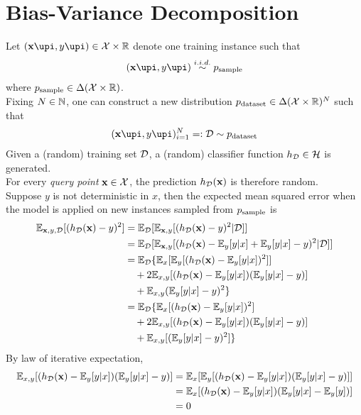 \documentclass{article}
\begin{document}
	\section{Bias-Variance Decomposition}
	\par Let $(\vex\upi, y\upi) \in \mc{X} \times \R$ denote one training instance such that
	\begin{align}
		(\vex\upi, y\upi) \overset{i.i.d.}{\sim} p_{\tx{sample}}
	\end{align}
	where $p_{\text{{sample}}} \in \Delta (\mathcal{{X}} \times \mathbb{R})$. \\
	Fixing $N \in \mathbb{N}$, one can construct a new distribution $p_{\text{{dataset}}} \in \Delta (\mathcal{{X}} \times \mathbb{R})^N$ such that 
	\begin{align}
		(\vex\upi, y\upi)_{i=1}^N =: \mc{D} \sim p_{\tx{dataset}}
	\end{align}
	Given a (random) training set $\mathcal{{D}}$, a (random) classifier function $h_{\mathcal{{D}}} \in \mathcal{{H}}$ is generated. \\
	For every \emph{query point} $\textbf{x} \in \mathcal{{X}}$, the prediction $h_{\mathcal{{D}}}(\textbf{x})$ is therefore random. \\
	Suppose $y$ is not deterministic in $x$, then the expected mean squared error when the model is applied on new instances sampled from $p_{\text{{sample}}}$ is
	\begin{align}
		\mathbb{E}_{\textbf{x}, y, \mathcal{{D}}}[(h_{\mathcal{{D}}}(\textbf{x}) - y)^2] &= \mathbb{E}_{\mathcal{{D}}}[
		\mathbb{E}_{\textbf{x}, y} [(h_{\mathcal{{D}}}(\textbf{x}) - y)^2|\mathcal{{D}}]
		] \\
		&= \mathbb{E}_{\mathcal{{D}}}[
		\mathbb{E}_{\textbf{x}, y} [(h_{\mathcal{{D}}}(\textbf{x}) - \mathbb{E}_y[y|x] + \mathbb{E}_y[y|x] - y)^2|\mathcal{{D}}]
		] \\
		&= \mathbb{E}_{\mathcal{{D}}} \{
		\mathbb{E}_x[
		\mathbb{E}_y[
		(h_{\mathcal{{D}}}(\textbf{x}) - \mathbb{E}_y[y|x])^2
		]
		] \\
		&\quad+ 2 \mathbb{E}_{x,y}[(h_{\mathcal{{D}}}(\textbf{x}) - \mathbb{E}_y[y|x]) (\mathbb{E}_y[y|x] - y)] \\
		&\quad+ \mathbb{E}_{x, y} (\mathbb{E}_y[y|x] - y)^2
		\} \\
		&= \mathbb{E}_{\mathcal{{D}}} \{
		\mathbb{E}_x[
		(h_{\mathcal{{D}}}(\textbf{x}) - \mathbb{E}_y[y|x])^2
		]
		\\
		&\quad+ 2 \mathbb{E}_{x,y}[(h_{\mathcal{{D}}}(\textbf{x}) - \mathbb{E}_y[y|x]) (\mathbb{E}_y[y|x] - y)] \\
		&\quad+ \mathbb{E}_{x, y} [(\mathbb{E}_y[y|x] - y)^2]
		\} \\
	\end{align}
	By law of iterative expectation,
	\begin{align}
		\mathbb{E}_{x,y}[(h_{\mathcal{{D}}}(\textbf{x}) - \mathbb{E}_y[y|x]) (\mathbb{E}_y[y|x] - y)] &= \mathbb{E}_x [
		\mathbb{E}_y[
		(h_{\mathcal{{D}}}(\textbf{x}) - \mathbb{E}_y[y|x]) (\mathbb{E}_y[y|x] - y)
		]] \\
		&= \mathbb{E}_x[
		(h_{\mathcal{{D}}}(\textbf{x}) - \mathbb{E}_y[y|x]) (\mathbb{E}_y[y|x] - \mathbb{E}_y[y])
		] \\
		&= 0
	\end{align}
\end{document}
